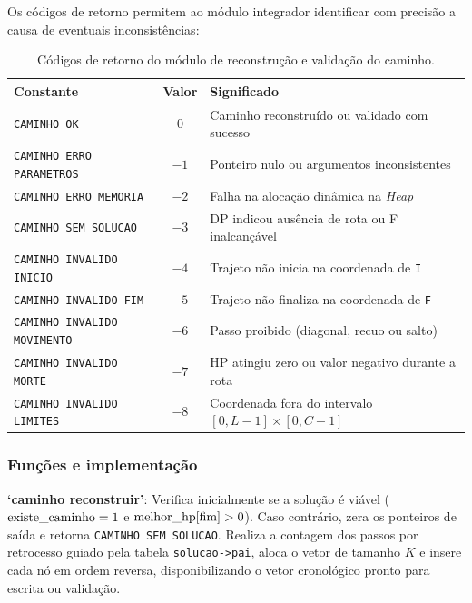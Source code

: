 \documentclass[12pt,a4paper]{article}
\makeatletter
\DeclareRobustCommand{\_}{%
  \ifmmode
    \nfss@text{\textunderscore}%
  \else
    \textunderscore\allowbreak
  \fi
}
\makeatother
\begin{document}
Os códigos de retorno permitem ao módulo integrador identificar com precisão a causa de eventuais inconsistências:

\begin{table}[htbp]
\centering
\small
\caption{Códigos de retorno do módulo de reconstrução e validação do caminho.}
\label{tab:codigos_caminho}
\vspace{0.2cm}
\begin{tabularx}{\textwidth}{|>{\raggedright\arraybackslash}p{5.5cm}|c|>{\raggedright\arraybackslash}X|}
\hline
\textbf{Constante} & \textbf{Valor} & \textbf{Significado} \\
\hline
\texttt{CAMINHO\_OK} & 0 & Caminho reconstruído ou validado com sucesso \\
\hline
\texttt{CAMINHO\_ERRO\_PARAMETROS} & $-1$ & Ponteiro nulo ou argumentos inconsistentes \\
\hline
\texttt{CAMINHO\_ERRO\_MEMORIA} & $-2$ & Falha na alocação dinâmica na \textit{Heap} \\
\hline
\texttt{CAMINHO\_SEM\_SOLUCAO} & $-3$ & DP indicou ausência de rota ou F inalcançável \\
\hline
\texttt{CAMINHO\_INVALIDO\_INICIO} & $-4$ & Trajeto não inicia na coordenada de \texttt{I} \\
\hline
\texttt{CAMINHO\_INVALIDO\_FIM} & $-5$ & Trajeto não finaliza na coordenada de \texttt{F} \\
\hline
\texttt{CAMINHO\_INVALIDO\_MOVIMENTO} & $-6$ & Passo proibido (diagonal, recuo ou salto) \\
\hline
\texttt{CAMINHO\_INVALIDO\_MORTE} & $-7$ & HP atingiu zero ou valor negativo durante a rota \\
\hline
\texttt{CAMINHO\_INVALIDO\_LIMITES} & $-8$ & Coordenada fora do intervalo $[0,L-1] \times [0,C-1]$ \\
\hline
\end{tabularx}
\end{table}

\subsubsection*{Funções e implementação}

\textbf{`caminho\_reconstruir'}: Verifica inicialmente se a solução é viável ($\text{existe\_caminho} = 1$ e $\text{melhor\_hp}[\text{fim}] > 0$). Caso contrário, zera os ponteiros de saída e retorna \texttt{CAMINHO\_SEM\_SOLUCAO}. Realiza a contagem dos passos por retrocesso guiado pela tabela \texttt{solucao->pai}, aloca o vetor de tamanho $K$ e insere cada nó em ordem reversa, disponibilizando o vetor cronológico pronto para escrita ou validação.
\end{document}
